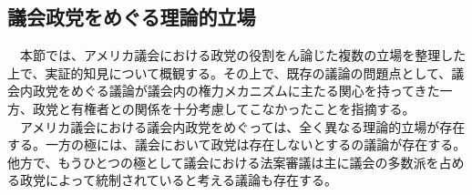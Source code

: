 \documentclass{article}
\begin{document}
\subsection{議会政党をめぐる理論的立場}
　本節では、アメリカ議会における政党の役割をん論じた複数の立場を整理した上で、実証的知見について概観する。その上で、既存の議論の問題点として、議会内政党をめぐる議論が議会内の権力メカニズムに主たる関心を持ってきた一方、政党と有権者との関係を十分考慮してこなかったことを指摘する。\\
　アメリカ議会における議会内政党をめぐっては、全く異なる理論的立場が存在する。一方の極には、議会において政党は存在しないとする\citet*{Krehbiel1998-ob,Krehbiel2010-ob}の議論が存在する。他方で、もうひとつの極として議会における法案審議は主に議会の多数派を占める政党によって統制されていると考える議論も存在する。\citep*{Rohde1991-da,Aldrich1995-xf,Cox2005-pn,Cox2007-xq}
\end{document}
